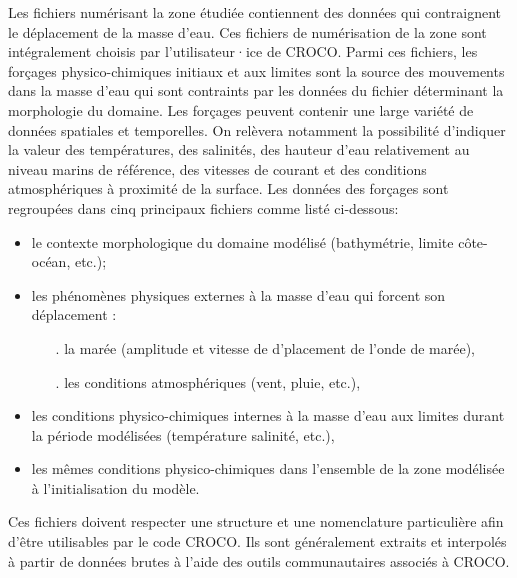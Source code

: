 \documentclass[10pt,a4paper,titlepage]{article}
\begin{document}
Les fichiers numérisant la zone étudiée contiennent des données qui contraignent le déplacement de la masse d'eau.
Ces fichiers de numérisation de la zone sont intégralement choisis par l'utilisateur·ice de CROCO.
Parmi ces fichiers, les forçages physico-chimiques initiaux et aux limites sont la source des mouvements dans la masse d'eau qui sont contraints par les données du fichier déterminant la morphologie du domaine.
Les forçages peuvent contenir une large variété de données spatiales et temporelles.
On relèvera notamment la possibilité d'indiquer la valeur des températures, des salinités, des hauteur d'eau relativement au niveau marins de référence, des vitesses de courant et des conditions atmosphériques à proximité de la surface.
Les données des forçages sont regroupées dans cinq principaux fichiers comme listé ci-dessous:

\begin{itemize}
    \item le contexte morphologique du domaine modélisé (bathymétrie, limite côte-océan, etc.);
    \item les phénomènes physiques externes à la masse d'eau qui forcent son déplacement :
    \begin{itemize}
        \item[.] la marée (amplitude et vitesse de d'placement de l'onde de marée),
        \item[.] les conditions atmosphériques (vent, pluie, etc.),
    \end{itemize}
    \item les conditions physico-chimiques internes à la masse d'eau aux limites durant la période modélisées (température salinité, etc.),
    \item les mêmes conditions physico-chimiques dans l'ensemble de la zone modélisée à l'initialisation du modèle.
\end{itemize}
Ces fichiers doivent respecter une structure et une nomenclature particulière afin d'être utilisables par le code CROCO.
Ils sont généralement extraits et interpolés à partir de données brutes à l'aide des outils communautaires associés à CROCO.
\end{document}
